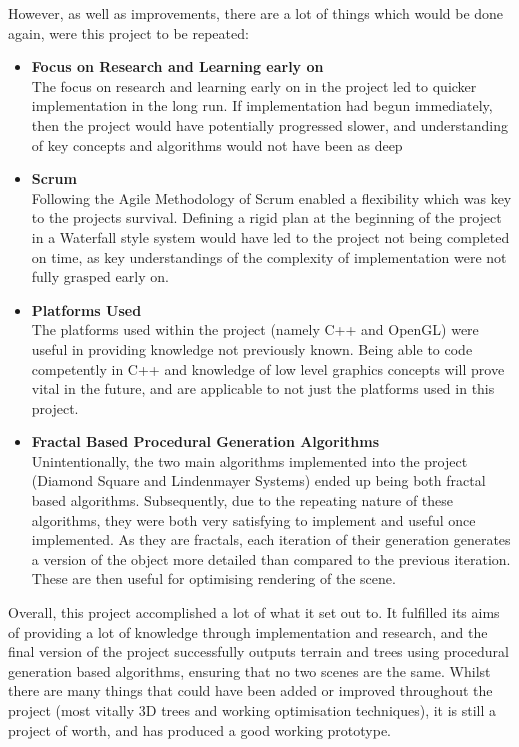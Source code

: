 \documentclass[a4paper,10pt]{report}
\begin{document}
However, as well as improvements, there are a lot of things which would be done again, were this project to be repeated: 
\begin{itemize}
    \item \textbf{Focus on Research and Learning early on} \\
    The focus on research and learning early on in the project led to quicker implementation in the long run. If implementation had begun immediately, then the project would have potentially progressed slower, and understanding of key concepts and algorithms would not have been as deep
    \item \textbf{Scrum} \\
    Following the Agile Methodology of Scrum enabled a flexibility which was key to the projects survival. Defining a rigid plan at the beginning of the project in a Waterfall style system would have led to the project not being completed on time, as key understandings of the complexity of implementation were not fully grasped early on.
    \item \textbf{Platforms Used} \\
    The platforms used within the project (namely C++ and OpenGL) were useful in providing knowledge not previously known. Being able to code competently in C++ and knowledge of low level graphics concepts will prove vital in the future, and are applicable to not just the platforms used in this project. \\
    \item \textbf{Fractal Based Procedural Generation Algorithms} \\
    Unintentionally, the two main algorithms implemented into the project (Diamond Square and Lindenmayer Systems) ended up being both fractal based algorithms. Subsequently, due to the repeating nature of these algorithms, they were both very satisfying to implement and useful once implemented. As they are fractals, each iteration of their generation generates a version of the object more detailed than compared to the previous iteration. These are then useful for optimising rendering of the scene. 
\end{itemize}

Overall, this project accomplished a lot of what it set out to. It fulfilled its aims of providing a lot of knowledge through implementation and research, and the final version of the project successfully outputs terrain and trees using procedural generation based algorithms, ensuring that no two scenes are the same. Whilst there are many things that could have been added or improved throughout the project (most vitally 3D trees and working optimisation techniques), it is still a project of worth, and has produced a good working prototype.
\clearpage
\end{document}

